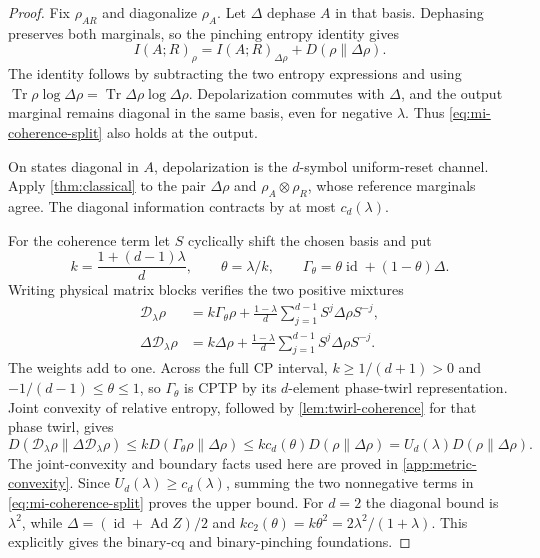 \documentclass[11pt]{article}
\numberwithin{equation}{section}
\theoremstyle{definition}
\theoremstyle{remark}
\DeclareMathOperator{\Tr}{Tr}
\DeclareMathOperator{\id}{id}
\DeclareMathOperator{\Ad}{Ad}
\newcommand{\D}{\mathcal D}
\begin{document}
\begin{proof}
Fix $\rho_{AR}$ and diagonalize $\rho_A$.
Let $\Delta$ dephase $A$ in that basis.
Dephasing preserves both marginals, so the pinching entropy identity gives
\begin{equation}
 I(A;R)_\rho=I(A;R)_{\Delta\rho}
            +D(\rho\|\Delta\rho).
 \label{eq:mi-coherence-split}
\end{equation}
The identity follows by subtracting the two entropy expressions and
using $\Tr\rho\log\Delta\rho=\Tr\Delta\rho\log\Delta\rho$.
Depolarization commutes with $\Delta$, and the output marginal remains
diagonal in the same basis, even for negative $\lambda$.
Thus \eqref{eq:mi-coherence-split} also holds at the output.

On states diagonal in $A$, depolarization is the $d$-symbol
uniform-reset channel. Apply \cref{thm:classical} to the pair
$\Delta\rho$ and $\rho_A\otimes\rho_R$, whose reference marginals
agree. The diagonal information contracts by at most $c_d(\lambda)$.

For the coherence term let $S$ cyclically shift the chosen basis and put
\[
 k=\frac{1+(d-1)\lambda}{d},\qquad \theta=\lambda/k,\qquad
 \Gamma_\theta=\theta\id+(1-\theta)\Delta .
 \]
Writing physical matrix blocks verifies the two positive mixtures
\begin{align*}
 \D_\lambda\rho
 &=k\Gamma_\theta\rho+
        \frac{1-\lambda}{d}\sum_{j=1}^{d-1}S^j\Delta\rho S^{-j},\\
 \Delta\D_\lambda\rho
 &=k\Delta\rho+
        \frac{1-\lambda}{d}\sum_{j=1}^{d-1}S^j\Delta\rho S^{-j}.
\end{align*}
The weights add to one. Across the full CP interval, $k\geq1/(d+1)>0$
and $-1/(d-1)\leq\theta\leq1$, so $\Gamma_\theta$ is CPTP by its
$d$-element phase-twirl representation.
Joint convexity of relative entropy, followed by
\cref{lem:twirl-coherence} for that phase twirl, gives
\[
 D(\D_\lambda\rho\|\Delta\D_\lambda\rho)
 \leq kD(\Gamma_\theta\rho\|\Delta\rho)
 \leq k c_d(\theta)D(\rho\|\Delta\rho)
 =U_d(\lambda)D(\rho\|\Delta\rho).
\]
The joint-convexity and boundary facts used here are proved in
\cref{app:metric-convexity}.
Since $U_d(\lambda)\geq c_d(\lambda)$, summing the two nonnegative
terms in \eqref{eq:mi-coherence-split} proves the upper bound.
For $d=2$ the diagonal bound is $\lambda^2$, while
$\Delta=(\id+\Ad Z)/2$ and
$k c_2(\theta)=k\theta^2=2\lambda^2/(1+\lambda)$.
This explicitly gives the binary-cq and binary-pinching foundations.


\end{proof}
\end{document}
